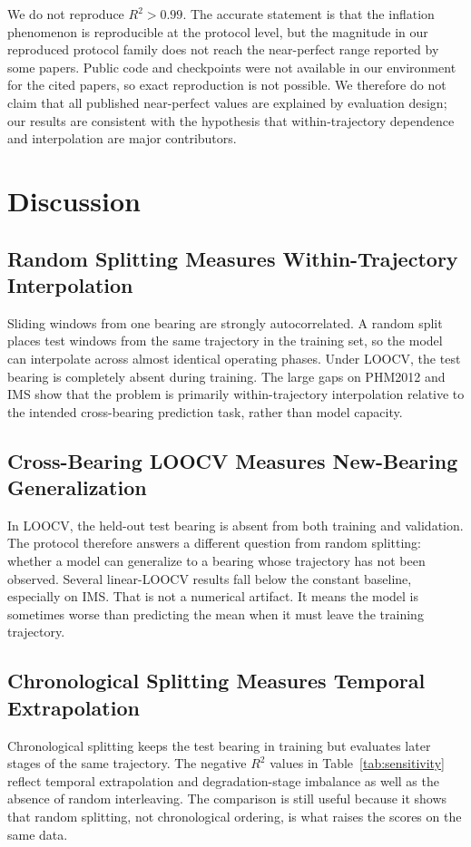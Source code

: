 \documentclass[5p,twocolumn]{elsarticle}
\begin{document}
We do not reproduce $R^2>0.99$. The accurate statement is that the inflation phenomenon is reproducible at the protocol level, but the magnitude in our reproduced protocol family does not reach the near-perfect range reported by some papers. Public code and checkpoints were not available in our environment for the cited papers, so exact reproduction is not possible. We therefore do not claim that all published near-perfect values are explained by evaluation design; our results are consistent with the hypothesis that within-trajectory dependence and interpolation are major contributors.

\section{Discussion}
\subsection{Random Splitting Measures Within-Trajectory Interpolation}
Sliding windows from one bearing are strongly autocorrelated. A random split places test windows from the same trajectory in the training set, so the model can interpolate across almost identical operating phases. Under LOOCV, the test bearing is completely absent during training. The large gaps on PHM2012 and IMS show that the problem is primarily within-trajectory interpolation relative to the intended cross-bearing prediction task, rather than model capacity.

\subsection{Cross-Bearing LOOCV Measures New-Bearing Generalization}
In LOOCV, the held-out test bearing is absent from both training and validation. The protocol therefore answers a different question from random splitting: whether a model can generalize to a bearing whose trajectory has not been observed. Several linear-LOOCV results fall below the constant baseline, especially on IMS. That is not a numerical artifact. It means the model is sometimes worse than predicting the mean when it must leave the training trajectory.

\subsection{Chronological Splitting Measures Temporal Extrapolation}
Chronological splitting keeps the test bearing in training but evaluates later stages of the same trajectory. The negative $R^2$ values in Table~\ref{tab:sensitivity} reflect temporal extrapolation and degradation-stage imbalance as well as the absence of random interleaving. The comparison is still useful because it shows that random splitting, not chronological ordering, is what raises the scores on the same data.
\end{document}
